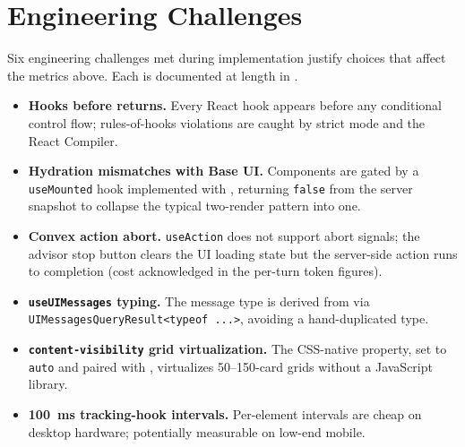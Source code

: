 \section{Engineering Challenges}
\label{sec:sys-engineering}

Six engineering challenges met during implementation justify
choices that affect the metrics above. Each is documented at
length in .

\begin{itemize}
  \item \textbf{Hooks before returns.} Every React hook appears
    before any conditional control flow; rules-of-hooks
    violations are caught by strict mode and the React Compiler.
  \item \textbf{Hydration mismatches with Base UI.} Components
    are gated by a \texttt{useMounted} hook implemented with
    , returning \texttt{false} from
    the server snapshot to collapse the typical two-render
    pattern into one.
  \item \textbf{Convex action abort.}
    \texttt{useAction} does not support abort signals; the
    advisor stop button clears the UI loading state but the
    server-side action runs to completion (cost acknowledged in
    the per-turn token figures).
  \item \textbf{\texttt{useUIMessages} typing.} The message type
    is derived from  via
    \texttt{UIMessagesQueryResult<typeof ...>}, avoiding a
    hand-duplicated type.
  \item \textbf{\texttt{content-visibility} grid
    virtualization.} The CSS-native 
    property, set to \texttt{auto} and paired with
    , virtualizes 50--150-card
    grids without a JavaScript library.
  \item \textbf{100~ms tracking-hook intervals.} Per-element
    intervals are cheap on desktop hardware; potentially
    measurable on low-end mobile.
\end{itemize}
